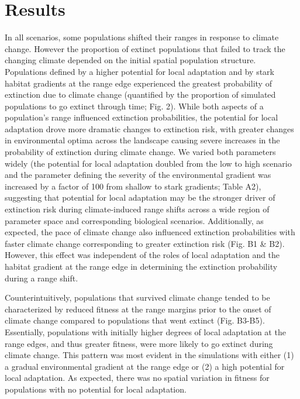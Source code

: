 \documentclass[11pt]{article}
\begin{document}
\section*{Results}
In all scenarios, some populations shifted their ranges in response to climate change. However the proportion of extinct populations that failed to track the changing climate depended on the initial spatial population structure. Populations defined by a higher potential for local adaptation and by stark habitat gradients at the range edge experienced the greatest probability of extinction due to climate change (quantified by the proportion of simulated populations to go extinct through time; Fig. 2). While both aspects of a population's range influenced extinction probabilities, the potential for local adaptation drove more dramatic changes to extinction risk, with greater changes in environmental optima across the landscape causing severe increases in the probability of extinction during climate change. We varied both parameters widely (the potential for local adaptation doubled from the low to high scenario and the parameter defining the severity of the environmental gradient was increased by a factor of 100 from shallow to stark gradients; Table A2), suggesting that potential for local adaptation may be the stronger driver of extinction risk during climate-induced range shifts across a wide region of parameter space and corresponding biological scenarios. Additionally, as expected, the pace of climate change also influenced extinction probabilities with faster climate change corresponding to greater extinction risk (Fig. B1 \& B2). However, this effect was independent of the roles of local adaptation and the habitat gradient at the range edge in determining the extinction probability during a range shift.

Counterintuitively, populations that survived climate change tended to be characterized by reduced fitness at the range margins prior to the onset of climate change compared to populations that went extinct (Fig. B3-B5). Essentially, populations with initially higher degrees of local adaptation at the range edges, and thus greater fitness, were more likely to go extinct during climate change. This pattern was most evident in the simulations with either (1) a gradual environmental gradient at the range edge or (2) a high potential for local adaptation. As expected, there was no spatial variation in fitness for populations with no potential for local adaptation. 
\end{document}
